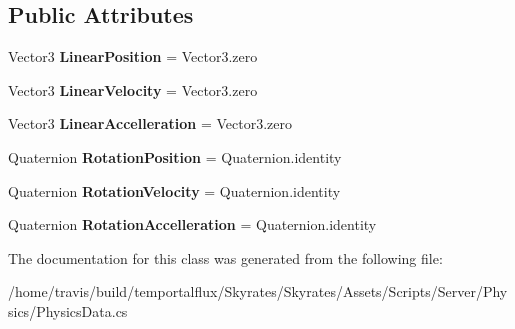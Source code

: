 \subsection*{Public Attributes}
\begin{DoxyCompactItemize}
\item 
\hypertarget{class_skyrates_1_1_common_1_1_a_i_1_1_physics_data_aa62e80e5cd9a5622c9c4caea5ca8ebdf}{Vector3 {\bfseries Linear\-Position} = Vector3.\-zero}\label{class_skyrates_1_1_common_1_1_a_i_1_1_physics_data_aa62e80e5cd9a5622c9c4caea5ca8ebdf}

\item 
\hypertarget{class_skyrates_1_1_common_1_1_a_i_1_1_physics_data_a1bf8ae102693ebe6bb3f6159c3b648ce}{Vector3 {\bfseries Linear\-Velocity} = Vector3.\-zero}\label{class_skyrates_1_1_common_1_1_a_i_1_1_physics_data_a1bf8ae102693ebe6bb3f6159c3b648ce}

\item 
\hypertarget{class_skyrates_1_1_common_1_1_a_i_1_1_physics_data_a7d817d59a50b825b7e4919baf3db79d5}{Vector3 {\bfseries Linear\-Accelleration} = Vector3.\-zero}\label{class_skyrates_1_1_common_1_1_a_i_1_1_physics_data_a7d817d59a50b825b7e4919baf3db79d5}

\item 
\hypertarget{class_skyrates_1_1_common_1_1_a_i_1_1_physics_data_ac9275d00cecc2ac504dccb6a8edb6992}{Quaternion {\bfseries Rotation\-Position} = Quaternion.\-identity}\label{class_skyrates_1_1_common_1_1_a_i_1_1_physics_data_ac9275d00cecc2ac504dccb6a8edb6992}

\item 
\hypertarget{class_skyrates_1_1_common_1_1_a_i_1_1_physics_data_ad4a85da9061ab0efe56db5f0d468fbdb}{Quaternion {\bfseries Rotation\-Velocity} = Quaternion.\-identity}\label{class_skyrates_1_1_common_1_1_a_i_1_1_physics_data_ad4a85da9061ab0efe56db5f0d468fbdb}

\item 
\hypertarget{class_skyrates_1_1_common_1_1_a_i_1_1_physics_data_acbf2b280bc51ca0f07c381a173cf846c}{Quaternion {\bfseries Rotation\-Accelleration} = Quaternion.\-identity}\label{class_skyrates_1_1_common_1_1_a_i_1_1_physics_data_acbf2b280bc51ca0f07c381a173cf846c}

\end{DoxyCompactItemize}


The documentation for this class was generated from the following file\-:\begin{DoxyCompactItemize}
\item 
/home/travis/build/temportalflux/\-Skyrates/\-Skyrates/\-Assets/\-Scripts/\-Server/\-Physics/Physics\-Data.\-cs\end{DoxyCompactItemize}
